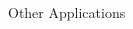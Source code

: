 \documentclass{beamer}
\begin{document}
\begin{frame}{Other Applications}
\begin{columns}
    \begin{column}{0.48\textwidth}
    \end{column}
    \begin{column}{0.48\textwidth}
\scalebox{0.19}{
}
\end{column}
\end{columns}
\end{frame}
\end{document}

